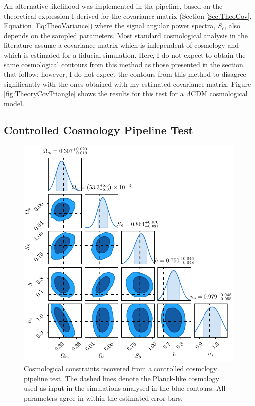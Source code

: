 An alternative likelihood was implemented in the \uclcl pipeline, based on the theoretical expression I derived for the covariance matrix (Section \ref{Sec:TheoCov}, Equation \eqref{Eq:TheoVariance}) where the signal angular power spectra, $S_{\ell}$, also depends on the sampled parameters. Most standard cosmological analysis in the literature \citep{2016BOSSCosmology,2017arXiv170801530D,2017MNRAS.465.1454H} assume a covariance matrix which is independent of cosmology and which is estimated for a fiducial simulation. Here, I do not expect to obtain the same cosmological contours from this method as those presented in the section that follow; however, I do not expect the contours from this method to disagree significantly with the ones obtained with my estimated covariance matrix. Figure \ref{fig:TheoryCovTriangle} shows the results for this test for a $\Lambda$CDM cosmological model. 

\subsection{Controlled Cosmology Pipeline Test}\label{Sec:ConsistControl}
\begin{figure}
\begin{center}
\includegraphics[scale=0.85]{BOSS-FIGS/Controlled_PipelineTest.pdf}
\caption[Cosmological constraints recovered from a controlled cosmology pipeline test.]{Cosmological constraints recovered from a controlled cosmology pipeline test. The dashed lines denote the Planck-like cosmology used as input in the simulations analysed in the blue contours. All parameters agree in within the estimated error-bars.}
\label{fig:Controlledtest}
\end{center}
\end{figure}

